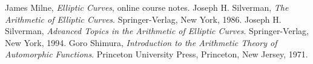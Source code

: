 \documentclass[12pt]{article}
\begin{document}
\begin{thebibliography}{9}
 James Milne, {\em Elliptic Curves}, online course notes. 
 Joseph H. Silverman, {\em The Arithmetic of Elliptic Curves}. Springer-Verlag, New York, 1986.
 Joseph H. Silverman, {\em Advanced Topics in
the Arithmetic of Elliptic Curves}. Springer-Verlag, New York,
1994.
 Goro Shimura, {\em Introduction to the
Arithmetic Theory of Automorphic Functions}. Princeton University
Press, Princeton, New Jersey, 1971.
\end{thebibliography}
\end{document}
